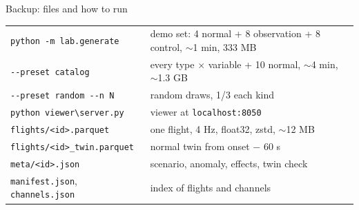 \documentclass[aspectratio=169,11pt]{beamer}
\begin{document}
\begin{frame}{Backup: files and how to run}
  \small
  \begin{tabularx}{\textwidth}{@{}l L@{}}
    \toprule
    \texttt{python -m lab.generate} & demo set: 4 normal + 8 observation + 8 control, $\sim$1 min, 333 MB \\
    \texttt{-{}-preset catalog} & every type $\times$ variable + 10 normal, $\sim$4 min, $\sim$1.3 GB \\
    \texttt{-{}-preset random -{}-n N} & random draws, 1/3 each kind \\
    \texttt{python viewer\textbackslash server.py} & viewer at \texttt{localhost:8050} \\
    \midrule
    \texttt{flights/<id>.parquet} & one flight, 4 Hz, float32, zstd, $\sim$12 MB \\
    \texttt{flights/<id>\_twin.parquet} & normal twin from onset $-$ 60 s \\
    \texttt{meta/<id>.json} & scenario, anomaly, effects, twin check \\
    \texttt{manifest.json}, \texttt{channels.json} & index of flights and channels \\
    \bottomrule
  \end{tabularx}
\end{frame}
\end{document}

